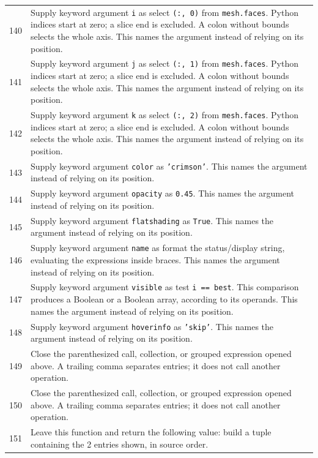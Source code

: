 \documentclass[11pt,a4paper]{book}
\begin{document}
\begin{longtable}{r p{}}
140 & Supply keyword argument \texttt{i} as select \texttt{(:, 0)} from \texttt{mesh.faces}. Python indices start at zero; a slice end is excluded. A colon without bounds selects the whole axis. This names the argument instead of relying on its position. \\

141 & Supply keyword argument \texttt{j} as select \texttt{(:, 1)} from \texttt{mesh.faces}. Python indices start at zero; a slice end is excluded. A colon without bounds selects the whole axis. This names the argument instead of relying on its position. \\

142 & Supply keyword argument \texttt{k} as select \texttt{(:, 2)} from \texttt{mesh.faces}. Python indices start at zero; a slice end is excluded. A colon without bounds selects the whole axis. This names the argument instead of relying on its position. \\

143 & Supply keyword argument \texttt{color} as \texttt{'crimson'}. This names the argument instead of relying on its position. \\

144 & Supply keyword argument \texttt{opacity} as \texttt{0.45}. This names the argument instead of relying on its position. \\

145 & Supply keyword argument \texttt{flatshading} as \texttt{True}. This names the argument instead of relying on its position. \\

146 & Supply keyword argument \texttt{name} as format the status/display string, evaluating the expressions inside braces. This names the argument instead of relying on its position. \\

147 & Supply keyword argument \texttt{visible} as test \texttt{i == best}. This comparison produces a Boolean or a Boolean array, according to its operands. This names the argument instead of relying on its position. \\

148 & Supply keyword argument \texttt{hoverinfo} as \texttt{'skip'}. This names the argument instead of relying on its position. \\

149 & Close the parenthesized call, collection, or grouped expression opened above. A trailing comma separates entries; it does not call another operation. \\

150 & Close the parenthesized call, collection, or grouped expression opened above. A trailing comma separates entries; it does not call another operation. \\

151 & Leave this function and return the following value: build a tuple containing the 2 entries shown, in source order. \\

\end{longtable}
\end{document}
